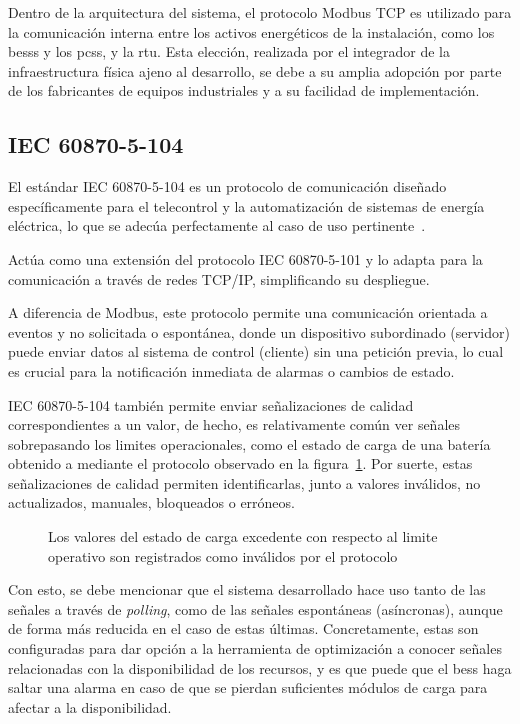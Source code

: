 Dentro de la arquitectura del sistema, el protocolo Modbus TCP es utilizado para la comunicación interna entre los activos energéticos de la instalación, como los \glspl{bess} y los \glspl{pcs}, y la \gls{rtu}. Esta elección, realizada por el integrador de la infraestructura física ajeno al desarrollo, se debe a su amplia adopción por parte de los fabricantes de equipos industriales y a su facilidad de implementación.

\subsection{IEC 60870-5-104}
\label{makereference3.3.2}

El estándar IEC 60870-5-104 es un protocolo de comunicación diseñado específicamente para el telecontrol y la automatización de sistemas de energía eléctrica, lo que se adecúa perfectamente al caso de uso pertinente~\cite{iec2016telecontrol}.

Actúa como una extensión del protocolo IEC 60870-5-101 y lo adapta para la comunicación a través de redes TCP/IP, simplificando su despliegue.

A diferencia de Modbus, este protocolo permite una comunicación orientada a eventos y no solicitada o espontánea, donde un dispositivo subordinado (servidor) puede enviar datos al sistema de control (cliente) sin una petición previa, lo cual es crucial para la notificación inmediata de alarmas o cambios de estado.

IEC 60870-5-104 también permite enviar señalizaciones de calidad correspondientes a un valor, de hecho, es relativamente común ver señales sobrepasando los limites operacionales, como el estado de carga de una batería obtenido a mediante el protocolo observado en la figura~\ref{fig:overflow-soc}. Por suerte, estas señalizaciones de calidad permiten identificarlas, junto a valores inválidos, no actualizados, manuales, bloqueados o erróneos.

\begin{figure}
  \centering
  \caption{Los valores del estado de carga excedente con respecto al limite operativo son registrados como inválidos por el protocolo}
  \label{fig:overflow-soc}
\end{figure}

Con esto, se debe mencionar que el sistema desarrollado hace uso tanto de las señales a través de \textit{polling}, como de las señales espontáneas (asíncronas), aunque de forma más reducida en el caso de estas últimas. Concretamente, estas son configuradas para dar opción a la herramienta de optimización a conocer señales relacionadas con la disponibilidad de los recursos, y es que puede que el \gls{bess} haga saltar una alarma en caso de que se pierdan suficientes módulos de carga para afectar a la disponibilidad.

